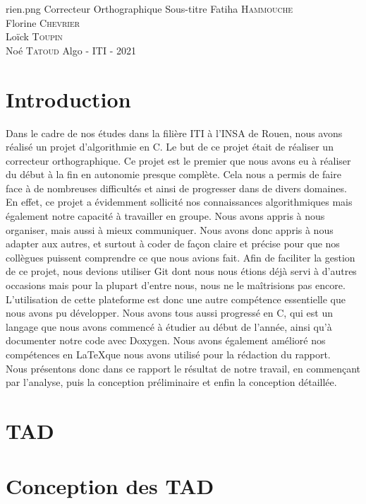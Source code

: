 \documentclass{article}
\begin{document}
\PageDeGarde	
{rien.png} %
{Correcteur Orthographique} %
{Sous-titre} %
{Fatiha \textsc{Hammouche} \\
Florine \textsc{Chevrier} \\
Loïck \textsc{Toupin} \\
Noé \textsc{Tatoud}}
{Algo - ITI - 2021} %



\tableofcontents

\clearpage
\section{Introduction}
Dans le cadre de nos études dans la filière ITI à l’INSA de Rouen, nous avons réalisé un projet d’algorithmie en C. Le but de ce projet était de réaliser un correcteur orthographique. Ce projet est le premier que nous avons eu à réaliser du début à la fin en autonomie presque complète. Cela nous a permis de faire face à de nombreuses difficultés et ainsi de progresser dans de divers domaines. \\
En effet, ce projet a évidemment sollicité nos connaissances algorithmiques mais également notre capacité à travailler en groupe. Nous avons appris à nous organiser, mais aussi à mieux communiquer. Nous avons donc appris à nous adapter aux autres, et surtout à coder de façon claire et précise pour que nos collègues puissent comprendre ce que nous avions fait. Afin de faciliter la gestion de ce projet, nous devions utiliser Git dont nous nous étions déjà servi à d’autres occasions mais pour la plupart d’entre nous, nous ne le maîtrisions pas encore. L’utilisation de cette plateforme est donc une autre compétence essentielle que nous avons pu développer. Nous avons tous aussi progressé en C, qui est un langage que nous avons commencé à étudier au début de l’année, ainsi qu’à documenter notre code avec Doxygen. Nous avons également amélioré nos compétences en \LaTeX que nous avons utilisé pour la rédaction du rapport. \\
Nous présentons donc dans ce rapport le résultat de notre travail, en commençant par l'analyse, puis la conception préliminaire et enfin la conception détaillée.

\clearpage
\section{TAD}
	


\clearpage
\section{Conception des TAD}
	
\end{document}
